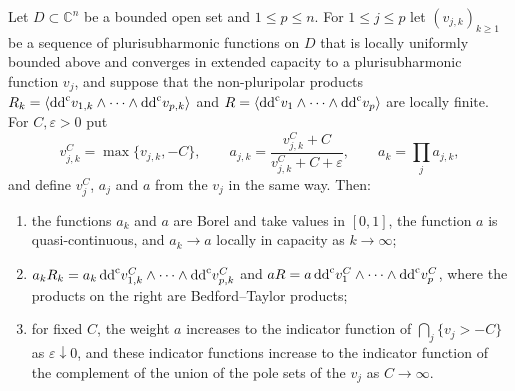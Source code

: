 \begin{lemma}\label{lem:nonpluripolar-cutoff-weights}
Let $D\subset\mathbb C^n$ be a bounded open set and $1\leq p\leq n$. For $1\leq j\leq p$ let $(v_{j,k})_{k\geq1}$ be a sequence of plurisubharmonic functions on $D$ that is locally uniformly bounded above and converges in extended capacity to a plurisubharmonic function $v_j$, and suppose that the non-pluripolar products $R_k=\langle\mathrm{dd}^{\mathrm{c}} v_{1,k}\wedge\cdots\wedge\mathrm{dd}^{\mathrm{c}} v_{p,k}\rangle$ and $R=\langle\mathrm{dd}^{\mathrm{c}} v_1\wedge\cdots\wedge\mathrm{dd}^{\mathrm{c}} v_p\rangle$ are locally finite. For $C,\varepsilon>0$ put
\[
 v_{j,k}^C=\max\{v_{j,k},-C\},\qquad
 a_{j,k}=\frac{v_{j,k}^C+C}{v_{j,k}^C+C+\varepsilon},\qquad
 a_k=\prod_j a_{j,k},
\]
and define $v_j^C$, $a_j$ and $a$ from the $v_j$ in the same way. Then:
\begin{enumerate}
 \item the functions $a_k$ and $a$ are Borel and take values in $[0,1]$, the function $a$ is quasi-continuous, and $a_k\to a$ locally in capacity as $k\to\infty$;
 \item $a_kR_k=a_k\,\mathrm{dd}^{\mathrm{c}} v_{1,k}^C\wedge\cdots\wedge\mathrm{dd}^{\mathrm{c}} v_{p,k}^C$ and $aR=a\,\mathrm{dd}^{\mathrm{c}} v_1^C\wedge\cdots\wedge\mathrm{dd}^{\mathrm{c}} v_p^C$, where the products on the right are Bedford--Taylor products;
 \item for fixed $C$, the weight $a$ increases to the indicator function of $\bigcap_j\{v_j>-C\}$ as $\varepsilon\downarrow0$, and these indicator functions increase to the indicator function of the complement of the union of the pole sets of the $v_j$ as $C\to\infty$.
\end{enumerate}
\end{lemma}
